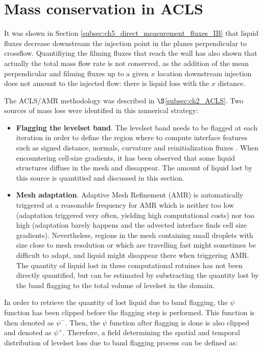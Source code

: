 \chapter{Mass conservation in ACLS}
\label{app:IBs_mass_conservation_ACLS}


It was shown in Section \ref{subsec:ch5_direct_measurement_fluxes_IB} that liquid fluxes decrease downstream the injection point in the planes perpendicular to crossflow. Quantifiying the filming fluxes that reach the wall has also shown that actually the total mass flow rate is not conserved, as the addition of the mean perpendicular and filming fluxes up to a given $x$ location downstream injection does not amount to the injected flow: there is liquid loss with the $x$ distance.

The ACLS/AMR methodology was described in $\S$\ref{subsec:ch2_ACLS}. Two sources of mass loss were identified in this numerical strategy: 

\begin{itemize}

	\item \textbf{Flagging the levelset band}. The levelset band needs to be flagged at each iteration in order to define the region where to compute interface features such as signed distance, normals, curvature and reinitialization fluxes . When encountering cell-size gradients, it has been observed that some liquid structures diffuse in the mesh and dissappear. The amount of liquid lost by this source is quantitied and discussed in this section.
	
	\item \textbf{Mesh adaptation}. Adaptive Mesh Refinement (AMR) is automatically triggered at a reasonable frequency for AMR which is neither too low (adaptation triggered very often, yielding high computational costs) nor too high (adaptation barely happens and the advected interface finds cell size gradients). Nevertheless, regions in the mesh containing small droplets with size close to mesh resolution or which are travelling fast might sometimes be difficult to adapt, and liquid might disappear there when triggering AMR. The quantity of liquid lost in these computational rotuines has not been directly quantified, but can be estimated by substracting the quantity lost by the band flagging to the total volume of levelset in the domain.

\end{itemize}

In order to retrieve the quantity of lost liquid due to band flagging, the $\psi$ function has been clipped before the flagging step is performed. This function is then denoted as $\psi^-$. Then, the  $\psi$ function after flagging is done is also clipped and denoted as $\psi^+$. Therefore, a field determining the spatial and temporal distribution of levelset loss due to band flagging process can be defined as:

